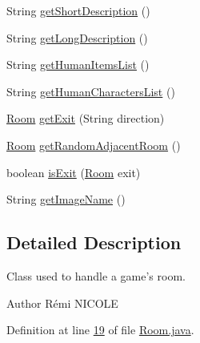 \begin{DoxyCompactItemize}
\item 
String \hyperlink{classpkg__world_1_1Room_adb98ed16e34549faabed35f90673d266}{get\-Short\-Description} ()
\item 
String \hyperlink{classpkg__world_1_1Room_acc8ee9123c9a77428c1e66fbba34aeac}{get\-Long\-Description} ()
\item 
String \hyperlink{classpkg__world_1_1Room_a3ea436ad00d00484b429992ef94535ac}{get\-Human\-Items\-List} ()
\item 
String \hyperlink{classpkg__world_1_1Room_a1ddbdc5022f7f494ac6250ca3f42672c}{get\-Human\-Characters\-List} ()
\item 
\hyperlink{classpkg__world_1_1Room}{Room} \hyperlink{classpkg__world_1_1Room_ae05ae991a1692ffb29e8aef632d18b95}{get\-Exit} (String direction)
\item 
\hyperlink{classpkg__world_1_1Room}{Room} \hyperlink{classpkg__world_1_1Room_a00952ff3743ec6cd8d238dada7506f63}{get\-Random\-Adjacent\-Room} ()
\item 
boolean \hyperlink{classpkg__world_1_1Room_a305aab25719c2b75a0c28c9a53a3c9d3}{is\-Exit} (\hyperlink{classpkg__world_1_1Room}{Room} exit)
\item 
String \hyperlink{classpkg__world_1_1Room_a5d1a496c1fd2e4ba73177e1182c9f4f1}{get\-Image\-Name} ()
\end{DoxyCompactItemize}


\subsection{Detailed Description}
Class used to handle a game's room. \begin{DoxyAuthor}{Author}
Rémi N\-I\-C\-O\-L\-E 
\end{DoxyAuthor}


Definition at line \hyperlink{Room_8java_source_l00019}{19} of file \hyperlink{Room_8java_source}{Room.\-java}.



